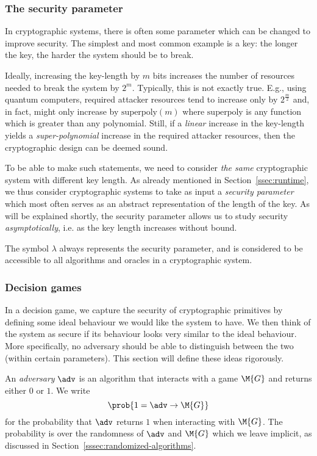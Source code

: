 \subsubsection{The security parameter}\label{sssec:security-parameter}
In cryptographic systems, there is often some parameter which can be changed to improve security. The simplest and most common example is a key: the longer the key, the harder the system should be to break.

Ideally, increasing the key-length by $m$ bits increases the number of resources needed to break the system by $2^m$. Typically, this is not exactly true. E.g., using quantum computers, required attacker resources tend to increase only by $2^{\frac{m}{2}}$ and, in fact, might only increase by $\text{superpoly}(m)$ where $\text{superpoly}$ is any function which is greater than any polynomial. Still, if a \emph{linear} increase in the key-length yields a \emph{super-polynomial} increase in the required attacker resources, then the cryptographic design can be deemed sound.

To be able to make such statements, we need to consider \emph{the same} cryptographic system with different key length. As already mentioned in Section~\ref{ssec:runtime}, we thus consider cryptographic systems to take as input a \emph{security parameter} which most often serves as an abstract representation of the length of the key. As will be explained shortly, the security parameter allows us to study security \emph{asymptotically}, i.e. as the key length increases without bound.

The symbol $\lambda$ always represents the security parameter, and is considered to be accessible to all algorithms and oracles in a cryptographic system.

\subsubsection{Decision games}\label{sssec:decision-games}
In a decision game, we capture the security of cryptographic primitives by defining some ideal behaviour we would like the system to have. We then think of the system as secure if its behaviour looks very similar to the ideal behaviour. More specifically, no adversary should be able to distinguish between the two (within certain parameters). This section will define these ideas rigorously.

An \emph{adversary} $\adv$ is an algorithm that interacts with a game $\M{G}$ and returns either $0$ or $1$. We write
\[\prob{1=\adv\circ\M{G}}\]
for the probability that $\adv$ returns $1$ when interacting with $\M{G}$. The probability is over the randomness of $\adv$ and $\M{G}$ which we leave implicit, as discussed in Section~\ref{sssec:randomized-algorithms}.

